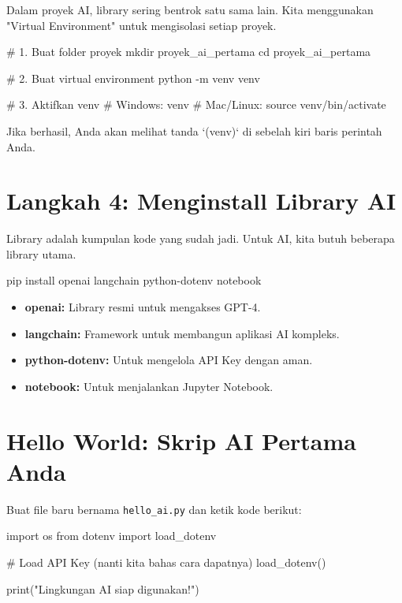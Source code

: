 Dalam proyek AI, library sering bentrok satu sama lain. Kita menggunakan "Virtual Environment" untuk mengisolasi setiap proyek.

\begin{codeblock}[title=Membuat Venv di Terminal]
# 1. Buat folder proyek
mkdir proyek_ai_pertama
cd proyek_ai_pertama

# 2. Buat virtual environment
python -m venv venv

# 3. Aktifkan venv
# Windows:
venv\Scripts\activate
# Mac/Linux:
source venv/bin/activate
\end{codeblock}

Jika berhasil, Anda akan melihat tanda `(venv)` di sebelah kiri baris perintah Anda.

\section{Langkah 4: Menginstall Library AI}

Library adalah kumpulan kode yang sudah jadi. Untuk AI, kita butuh beberapa library utama.

\begin{codeblock}[title=Install Libraries]
pip install openai langchain python-dotenv notebook
\end{codeblock}

\begin{itemize}
    \item \textbf{openai:} Library resmi untuk mengakses GPT-4.
    \item \textbf{langchain:} Framework untuk membangun aplikasi AI kompleks.
    \item \textbf{python-dotenv:} Untuk mengelola API Key dengan aman.
    \item \textbf{notebook:} Untuk menjalankan Jupyter Notebook.
\end{itemize}

\section{Hello World: Skrip AI Pertama Anda}

Buat file baru bernama \texttt{hello\_ai.py} dan ketik kode berikut:

\begin{codeblock}[language=Python]
import os
from dotenv import load_dotenv

# Load API Key (nanti kita bahas cara dapatnya)
load_dotenv()

print("Lingkungan AI siap digunakan!")
\end{codeblock}

